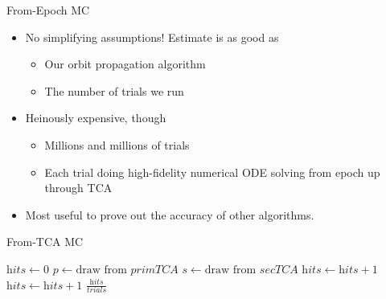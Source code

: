 \documentclass[pdf]{beamer}
\begin{document}
\begin{frame}{From-Epoch MC}
  \begin{itemize}
  \item No simplifying assumptions! Estimate is as good as
    \begin{itemize}
    \item Our orbit propagation algorithm
    \item The number of trials we run
    \end{itemize}
  \item Heinously expensive, though
    \begin{itemize}
    \item Millions and millions of trials
    \item Each trial doing high-fidelity numerical ODE solving from epoch up
      through TCA
    \end{itemize}
  \item Most useful to prove out the accuracy of other algorithms.
  \end{itemize}
\end{frame}

\begin{frame}{From-TCA MC}
  \begin{algorithmic}
    \State $\textit{hits} \gets 0$
    \For{$i \in [0,\ldots,\textit{trials})$}
      \State $p \gets \text{draw from } \textit{primTCA}$ 
      \State $s \gets \text{draw from } \textit{secTCA}$
        \State $\textit{hits} \gets \textit{hits} + 1$
        \State $\textit{hits} \gets \textit{hits} + 1$
      \EndIf
      \EndFor
    \State \Return $\frac{\textit{hits}}{\textit{trials}}$
    \EndProcedure  
  \end{algorithmic}
\end{frame}
\end{document}
